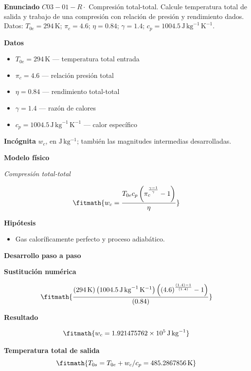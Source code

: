 \documentclass[10pt,openany]{book}
\begin{document}
\begin{tcolorbox}[title={Problema resuelto 1}, studiumworked, breakable]

\noindent\textbf{Enunciado}
\(C03-01-R \cdot\) Compresión total-total. Calcule temperatura total de salida y trabajo de una compresión con relación de presión y rendimiento dados. Datos: \(T_{0e}=294\, \mathrm{K}\); \(\pi_c=4.6\); \(\eta=0.84\); \(\gamma=1.4\); \(c_p=1004.5\, \mathrm{J}\,\mathrm{kg}^{-1}\,\mathrm{K}^{-1}\).

\noindent\textbf{Datos}
\begin{itemize}
\item $T_{0e} = 294\,\mathrm{K}$ — temperatura total entrada
\item $\pi_c = 4.6$ — relación presión total
\item $\eta = 0.84$ — rendimiento total-total
\item $\gamma = 1.4$ — razón de calores
\item $c_p = 1004.5\,\mathrm{J}\,\mathrm{kg}^{-1}\,\mathrm{K}^{-1}$ — calor específico
\end{itemize}

\noindent\textbf{Incógnita}
$w_c$, en $\mathrm{J\,kg^{-1}}$; también las magnitudes intermedias desarrolladas.

\noindent\textbf{Modelo físico}

\noindent\textit{Compresión total-total}

\[
\fitmath{w_c=\frac{T_{0e} c_p \left(\pi_c^{\frac{\gamma - 1}{\gamma}} - 1\right)}{\eta}}
\]

\noindent\textbf{Hipótesis}
\begin{itemize}
\item Gas caloríficamente perfecto y proceso adiabático.
\end{itemize}

\noindent\textbf{Desarrollo paso a paso}



\noindent\textbf{Sustitución numérica}

\[
\fitmath{\frac{\left(294\,\mathrm{K}\right) \left(1004.5\,\mathrm{J}\,\mathrm{kg}^{-1}\,\mathrm{K}^{-1}\right) \left(\left(4.6\right)^{\frac{\left(1.4\right) - 1}{\left(1.4\right)}} - 1\right)}{\left(0.84\right)}}
\]

\noindent\textbf{Resultado}

\[
\fitmath{w_c=1.921475762\times10^{5}\,\mathrm{J}\,\mathrm{kg}^{-1}}
\]

\noindent\textbf{Temperatura total de salida}
\[
\fitmath{T_{0s}=T_{0e}+w_c/c_p=485.2867856\,\mathrm{K}}
\]


\end{tcolorbox}
\end{document}
